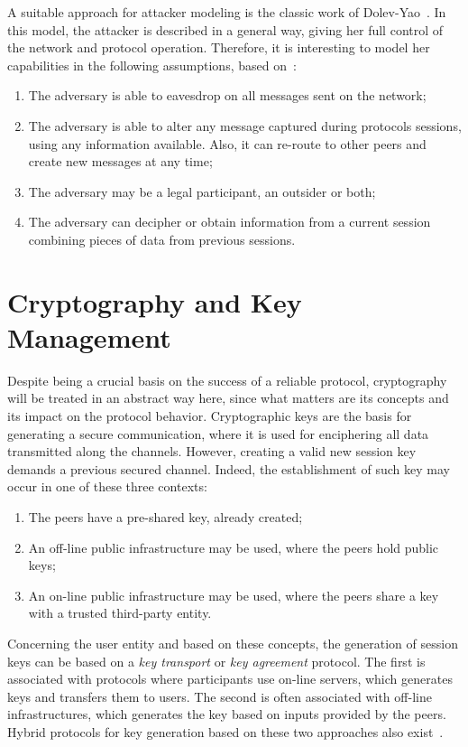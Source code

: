 A suitable approach for attacker modeling is the classic work of Dolev-Yao~\cite{DolevYao81}. In this model, the attacker is described in a general way, giving her full control of the network and protocol operation. Therefore, it is interesting to model her capabilities in the following assumptions, based on~\cite{BoydMathuria2008}:

\begin{enumerate}
  \item The adversary is able to eavesdrop on all messages sent on the network;
  \item The adversary is able to alter any message captured during protocols sessions, using any information available. Also, it can re-route to other peers and create new messages at any time;
  \item The adversary may be a legal participant, an outsider or both;
  \item The adversary can decipher or obtain information from a current session combining pieces of data from previous sessions.
\end{enumerate}





\section{Cryptography and Key Management}
Despite being a crucial basis on the success of a reliable protocol, cryptography will be treated in an abstract way here, since what matters are its concepts and its impact on the protocol behavior. Cryptographic keys are the basis for generating a secure communication, where it is used for enciphering all data transmitted along the channels. However, creating a valid new session key demands a previous secured channel. Indeed, the establishment of such key may occur in one of these three contexts:

\begin{enumerate}
  \item The peers have a pre-shared key, already created;
  \item An off-line public infrastructure may be used, where the peers hold public keys;
  \item An on-line public infrastructure may be used, where the peers share a key with a trusted third-party entity.
\end{enumerate}

Concerning the user entity and based on these concepts, the generation of session keys can be based on a \textit{key transport} or \textit{key agreement} protocol. The first is associated with protocols where participants use on-line servers, which generates keys and transfers them to users. The second is often associated with off-line infrastructures, which generates the key based on inputs provided by the peers. Hybrid protocols for key generation based on these two approaches also exist~\cite{BoydMathuria2008}.





